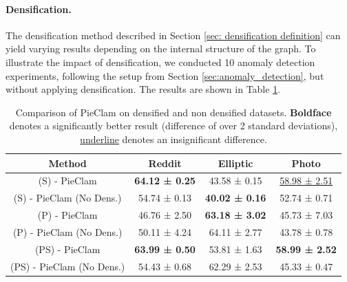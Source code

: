 \documentclass{article}
\theoremstyle{plain}
\theoremstyle{definition}
\theoremstyle{remark}
\begin{document}
\paragraph{Densification.}
\label{sec:ablation densification}
The densification method described in Section \ref{sec: densification definition} can yield varying results depending on the internal structure of the graph. To illustrate the impact of densification, we conducted 10 anomaly detection experiments, following the setup from Section \ref{sec:anomaly_detection}, but without applying densification. The results are shown in Table \ref{TableAblation}.
\begin{table}[H]
\centering
\small
\begin{tabular}{|c|c|c|c|}
    \hline
    Method & Reddit & Elliptic & Photo \\
    \hline
    (S) - PieClam & \textbf{64.12 ± 0.25} & 43.58 ± 0.15 & \underline{58.98 ± 2.51} \\
    (S) - PieClam (No Dens.) & 54.74 ± 0.13 & \textbf{40.02 ± 0.16} & 52.74 ± 0.71 \\
    \hline
    (P) - PieClam & 46.76 ± 2.50 & \textbf{63.18 ± 3.02} & 45.73 ± 7.03 \\
    (P) - PieClam (No Dens.) & 50.11 ± 4.24 & 64.11 ± 2.77 & 43.78 ± 0.78 \\
    \hline
    (PS) - PieClam & \textbf{63.99 ± 0.50} & 53.81 ± 1.63 & \textbf{58.99 ± 2.52} \\
    (PS) - PieClam (No Dens.) & 54.43 ± 0.68 & 62.29 ± 2.53 & 45.33 ± 0.47 \\
    \hline
\end{tabular}
  
\caption{Comparison of PieClam on densified and non densified datasets. \textbf{Boldface} denotes a significantly better result (difference of over 2 standard deviations), \underline{underline} denotes an insignificant difference.}
\label{TableAblation}
\end{table}
\end{document}

